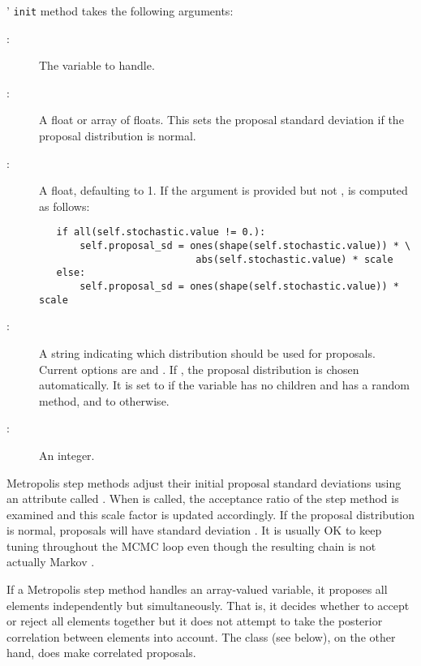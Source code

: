 ' \texttt{init} method takes the following arguments:
\begin{description}
   \item[:] The variable to handle.
   \item[:] A float or array of floats. This sets the proposal standard deviation if the proposal distribution is normal.   
   \item[:] A float, defaulting to 1. If the  argument is provided but not ,  is computed as follows:
   \begin{verbatim}
   if all(self.stochastic.value != 0.):
       self.proposal_sd = ones(shape(self.stochastic.value)) * \
                           abs(self.stochastic.value) * scale
   else:
       self.proposal_sd = ones(shape(self.stochastic.value)) * scale
   \end{verbatim}
   \item[:] A string indicating which distribution should be used for proposals. Current options are  and . If , the proposal distribution is chosen automatically. It is set to  if the variable has no children and has a random method, and to  otherwise. 
   \item[\code{verbose}:] An integer.
\end{description}

Metropolis step methods adjust their initial proposal standard deviations using an attribute called . When  is called, the acceptance ratio of the step method is examined and this scale factor is updated accordingly. If the proposal distribution is normal, proposals will have standard deviation . It is usually OK to keep tuning throughout the MCMC loop even though the resulting chain is not actually Markov \citep{tuning}. %

If a Metropolis step method handles an array-valued variable, it proposes all elements independently but simultaneously. That is, it decides whether to accept or reject all elements together but it does not attempt to take the posterior correlation between elements into account. The  class (see below), on the other hand, does make correlated proposals.


